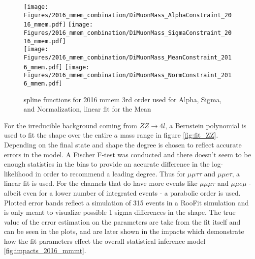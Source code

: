 \begin{figure}[ht!b]
    \centering 
    \texttt{[image: Figures/2016\_mmem\_combination/DiMuonMass\_AlphaConstraint\_2016\_mmem.pdf]}
    \texttt{[image: Figures/2016\_mmem\_combination/DiMuonMass\_SigmaConstraint\_2016\_mmem.pdf]}\\
    \texttt{[image: Figures/2016\_mmem\_combination/DiMuonMass\_MeanConstraint\_2016\_mmem.pdf]}
    \texttt{[image: Figures/2016\_mmem\_combination/DiMuonMass\_NormConstraint\_2016\_mmem.pdf]}\\
    \caption{\label{fig:spline_2016_mmem} spline functions for 2016 mmem 3rd order used for Alpha, Sigma, and Normalization, linear fit for the Mean}
\end{figure}

For the irreducible background coming from $ZZ\rightarrow 4 l$, a Bernstein polynomial is used to fit the shape over the entire $a$ mass range in figure \ref{fig:fit_ZZ}. Depending on the final state and shape the degree is chosen to reflect accurate errors in the model. A Fischer F-test was conducted and there doesn't seem to be enough statistics in the bins to provide an accurate difference in the log-likelihood in order to recommend a leading degree. Thus for $\mu\mu\tau\tau$ and $\mu\mu e \tau$, a linear fit is used. For the channels that do have more events like $\mu\mu\mu\tau$ and $\mu\mu e \mu$ - albeit even for a lower number of integrated events - a parabolic order is used. Plotted error bands reflect a simulation of 315 events in a RooFit simulation and is only meant to visualize possible 1 sigma differences in the shape. The true value of the error estimation on the parameters are take from the fit itself and can be seen in the plots, and are later shown in the impacts which demonstrate how the fit parameters effect the overall statistical inference model \ref{fig:impacts_2016_mmmt}. 

